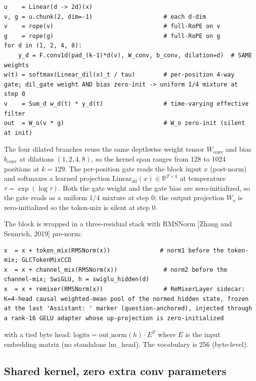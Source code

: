 \documentclass[11pt]{article}
\begin{document}
\begin{lstlisting}
u    = Linear(d -> 2d)(x)
v, g = u.chunk(2, dim=-1)                    # each d-dim
v    = rope(v)                               # full-RoPE on v
g    = rope(g)                               # full-RoPE on g
for d in (1, 2, 4, 8):
    y_d = F.conv1d(pad_(k-1)*d(v), W_conv, b_conv, dilation=d)  # SAME weights
w(t) = softmax(Linear_dil(x)_t / tau)        # per-position 4-way gate; dil_gate weight AND bias zero-init -> uniform 1/4 mixture at step 0
v    = Sum_d w_d(t) * y_d(t)                 # time-varying effective filter
out  = W_o(v * g)                            # W_o zero-init (silent at init)
\end{lstlisting}

The four dilated branches reuse the same depthwise weight tensor $W_{\text{conv}}$ and bias $b_{\text{conv}}$ at dilations $(1, 2, 4, 8)$, so the kernel span ranges from 128 to 1024 positions at $k=129$. The per-position gate reads the block input $x$ (post-norm) and softmaxes a learned projection $\text{Linear}_{\text{dil}}(x) \in \mathbb{R}^{T \times 4}$ at temperature $\tau = \exp(\log \tau)$. Both the gate weight and the gate bias are zero-initialized, so the gate reads as a uniform $1/4$ mixture at step 0; the output projection $W_o$ is zero-initialized so the token-mix is silent at step 0.

The block is wrapped in a three-residual stack with RMSNorm [Zhang and Sennrich, 2019] pre-norm:

\begin{lstlisting}
x  = x + token_mix(RMSNorm(x))              # norm1 before the token-mix; GLCTokenMixCCD
x  = x + channel_mix(RMSNorm(x))             # norm2 before the channel-mix; SwiGLU, h = swiglu_hidden(d)
x  = x + remixer(RMSNorm(x))                 # ReMixerLayer sidecar: K=4-head causal weighted-mean pool of the normed hidden state, frozen at the last 'Assistant: ' marker (question-anchored), injected through a rank-16 GELU adapter whose up-projection is zero-initialized
\end{lstlisting}

with a tied byte head: $\text{logits} = \text{out\_norm}(h) \cdot E^T$ where $E$ is the input embedding matrix (no standalone lm\_head). The vocabulary is 256 (byte-level).

\subsection{Shared kernel, zero extra conv parameters}
\end{document}
